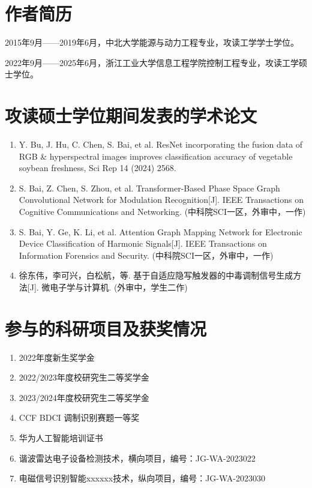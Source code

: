 {
    \setcounter{section}{0}

    \section{作者简历} 
    2015年9月——2019年6月，中北大学能源与动力工程专业，攻读工学学士学位。

    2022年9月——2025年6月，浙江工业大学信息工程学院控制工程专业，攻读工学硕士学位。

    \section{攻读硕士学位期间发表的学术论文} 
    \begin{enumerate}
        \item Y. Bu, J. Hu, C. Chen, S. Bai, et al. ResNet incorporating the fusion data of RGB \& hyperspectral images improves classification accuracy of vegetable soybean freshness, Sci Rep 14 (2024) 2568.
        \item S. Bai, Z. Chen, S. Zhou, et al. Transformer-Based Phase Space Graph Convolutional Network for Modulation Recognition[J]. IEEE Transactions on Cognitive Communications and Networking. (中科院SCI一区，外审中，一作)
        \item S. Bai, Y. Ge, K. Li, et al. Attention Graph Mapping Network for Electronic Device Classification of Harmonic Signals[J]. IEEE Transactions on Information Forensics and Security. (中科院SCI一区，外审中，一作)
        \item 徐东伟，李可兴，白松航，等. 基于自适应隐写触发器的中毒调制信号生成方法[J]. 微电子学与计算机. (外审中，学生二作)
    \end{enumerate}

    \section{参与的科研项目及获奖情况}
    \begin{enumerate}
        \item	2022年度新生奖学金
        \item	2022/2023年度校研究生二等奖学金
        \item	2023/2024年度校研究生二等奖学金
        \item	CCF BDCI 调制识别赛题一等奖
        \item	华为人工智能培训证书
        \item	谐波雷达电子设备检测技术，横向项目，编号：JG-WA-2023022
        \item	电磁信号识别智能xxxxxx技术，纵向项目，编号：JG-WA-2023030
    \end{enumerate}

}
